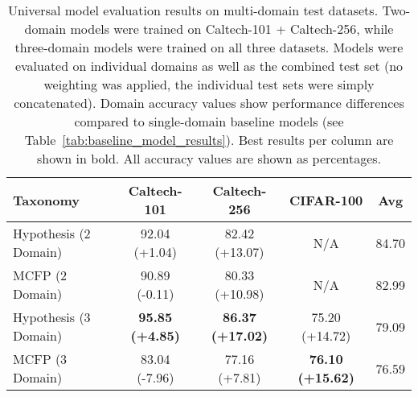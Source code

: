 \begin{table}[ht]
\centering
\caption{Universal model evaluation results on multi-domain test datasets. Two-domain models were trained on Caltech-101 + Caltech-256, while three-domain models were trained on all three datasets. Models were evaluated on individual domains as well as the combined test set (no weighting was applied, the individual test sets were simply concatenated). Domain accuracy values show performance differences compared to single-domain baseline models (see Table~\ref{tab:baseline_model_results}). Best results per column are shown in bold. All accuracy values are shown as percentages.}
\label{tab:universal_model_results}
\begin{tabular}{lcccc}
\toprule
Taxonomy & Caltech-101 & Caltech-256 & CIFAR-100 & Avg \\
\midrule
Hypothesis (2 Domain) & 92.04 (+1.04) & 82.42 (+13.07) & N/A & 84.70 \\
MCFP (2 Domain) & 90.89 (-0.11) & 80.33 (+10.98) & N/A & 82.99 \\
Hypothesis (3 Domain) & \textbf{95.85 (+4.85)} & \textbf{86.37 (+17.02)} & 75.20 (+14.72) & 79.09 \\
MCFP (3 Domain) & 83.04 (-7.96) & 77.16 (+7.81) & \textbf{76.10 (+15.62)} & 76.59 \\
\bottomrule
\end{tabular}
\end{table}
